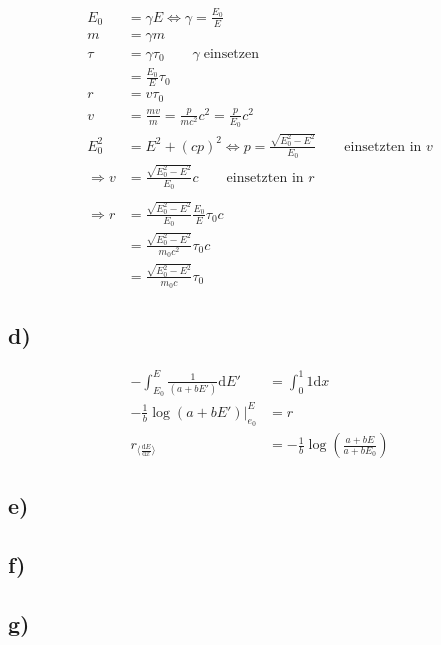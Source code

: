     \begin{align}
        E_0 &= \gamma E \Leftrightarrow \gamma = \frac{E_0}{E}\\
        m &= \gamma m\\
        \tau &= \gamma \tau_0 \qquad \gamma\; \text{einsetzen}\\
        &= \frac{E_0}{E} \tau_0\\
        r &= v\tau_0\\
        v &= \frac{mv}{m} = \frac{p}{mc^2}c^2 = \frac{p}{E_0}c^2\\
        E_0^2 &= E^2 + (cp)^2 \Leftrightarrow p = \frac{\sqrt{E_0^2-E^2}}{E_0} \qquad \text{einsetzten in $v$}\\
        \Rightarrow v &= \frac{\sqrt{E_0^2-E^2}}{E_0}c \qquad \text{einsetzten in $r$}\\
        \\
        \Rightarrow r &= \frac{\sqrt{E_0^2-E^2}}{E_0} \frac{E_0}{E} \tau_0 c\\
        &= \frac{\sqrt{E_0^2-E^2}}{m_0 c^2} \tau_0 c\\
        &= \frac{\sqrt{E_0^2-E^2}}{m_0 c} \tau_0
    \end{align}

\subsection{d)}

    \begin{align}
        -\int_{E_0}^{E} \frac{1}{(a+bE')} \mathrm{d}E' &= \int_{0}^{1} 1 \mathrm{d}x\\
        -\frac{1}{b}\log(a+bE')\vert_{e_0}^{E} &= r\\
        r_{\langle \frac{\mathrm{d}E}{\mathrm{d}x} \rangle} &= -\frac{1}{b}\log\left(\frac{a+bE}{a+bE_0}\right)
    \end{align}

\subsection{e)}

\subsection{f)}

\subsection{g)}

